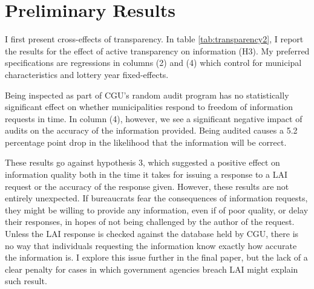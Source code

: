 \documentclass[11pt]{article}
\begin{document}
\section{Preliminary Results} \label{sec:results_paper3}

I first present cross-effects of transparency. In table \ref{tab:transparency2}, I report the results for the effect of active transparency on information (H3). My preferred specifications are regressions in columns (2) and (4) which control for municipal characteristics and lottery year fixed-effects.



Being inspected as part of CGU's random audit program has no statistically significant effect on whether municipalities respond to freedom of information requests in time. In column (4), however, we see a significant negative impact of audits on the accuracy of the information provided. Being audited causes a 5.2 percentage point drop in the likelihood that the information will be correct.

These results go against hypothesis 3, which suggested a positive effect on information quality both in the time it takes for issuing a response to a LAI request or the accuracy of the response given. However, these results are not entirely unexpected. If bureaucrats fear the consequences of information requests, they might be willing to provide any information, even if of poor quality, or delay their responses, in hopes of not being challenged by the author of the request. Unless the LAI response is checked against the database held by CGU, there is no way that individuals requesting the information know exactly how accurate the information is. I explore this issue further in the final paper, but the lack of a clear penalty for cases in which government agencies breach LAI might explain such result.


\end{document}
